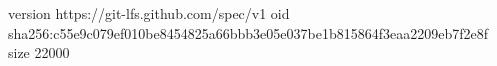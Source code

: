 version https://git-lfs.github.com/spec/v1
oid sha256:c55e9c079ef010be8454825a66bbb3e05e037be1b815864f3eaa2209eb7f2e8f
size 22000
